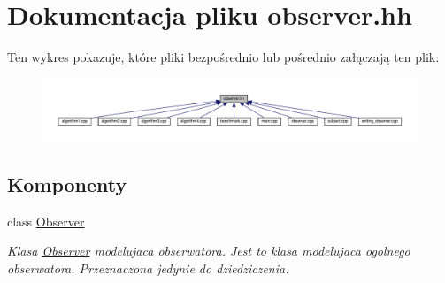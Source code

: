 \hypertarget{observer_8hh}{\section{Dokumentacja pliku observer.\-hh}
\label{observer_8hh}
}
Ten wykres pokazuje, które pliki bezpośrednio lub pośrednio załączają ten plik\-:\nopagebreak
\begin{figure}[H]
\begin{center}
\leavevmode
\includegraphics[width=350pt]{observer_8hh__dep__incl}
\end{center}
\end{figure}
\subsection*{Komponenty}
\begin{DoxyCompactItemize}
\item 
class \hyperlink{class_observer}{Observer}
\begin{DoxyCompactList}\small\item\em Klasa \hyperlink{class_observer}{Observer} modelujaca obserwatora. Jest to klasa modelujaca ogolnego obserwatora. Przeznaczona jedynie do dziedziczenia. \end{DoxyCompactList}\end{DoxyCompactItemize}
